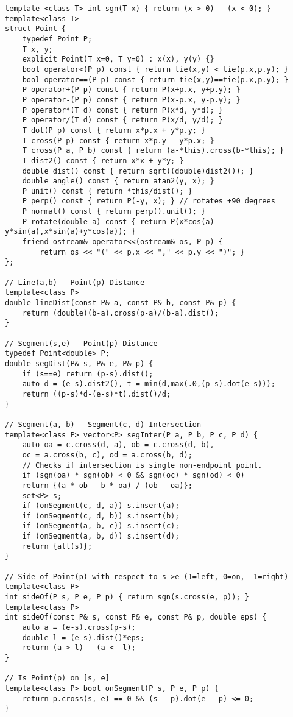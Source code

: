 \documentclass[a4paper,9pt]{article}
\begin{document}
\begin{lstlisting}
template <class T> int sgn(T x) { return (x > 0) - (x < 0); }
template<class T>
struct Point {
	typedef Point P;
	T x, y;
	explicit Point(T x=0, T y=0) : x(x), y(y) {}
	bool operator<(P p) const { return tie(x,y) < tie(p.x,p.y); }
	bool operator==(P p) const { return tie(x,y)==tie(p.x,p.y); }
	P operator+(P p) const { return P(x+p.x, y+p.y); }
	P operator-(P p) const { return P(x-p.x, y-p.y); }
	P operator*(T d) const { return P(x*d, y*d); }
	P operator/(T d) const { return P(x/d, y/d); }
	T dot(P p) const { return x*p.x + y*p.y; }
	T cross(P p) const { return x*p.y - y*p.x; }
	T cross(P a, P b) const { return (a-*this).cross(b-*this); }
	T dist2() const { return x*x + y*y; }
	double dist() const { return sqrt((double)dist2()); }
	double angle() const { return atan2(y, x); }
	P unit() const { return *this/dist(); }
	P perp() const { return P(-y, x); } // rotates +90 degrees
	P normal() const { return perp().unit(); }
	P rotate(double a) const { return P(x*cos(a)-y*sin(a),x*sin(a)+y*cos(a)); }
	friend ostream& operator<<(ostream& os, P p) {
		return os << "(" << p.x << "," << p.y << ")"; }
};

// Line(a,b) - Point(p) Distance
template<class P>
double lineDist(const P& a, const P& b, const P& p) {
	return (double)(b-a).cross(p-a)/(b-a).dist();
}

// Segment(s,e) - Point(p) Distance
typedef Point<double> P;
double segDist(P& s, P& e, P& p) {
	if (s==e) return (p-s).dist();
	auto d = (e-s).dist2(), t = min(d,max(.0,(p-s).dot(e-s)));
	return ((p-s)*d-(e-s)*t).dist()/d;
}

// Segment(a, b) - Segment(c, d) Intersection
template<class P> vector<P> segInter(P a, P b, P c, P d) {
	auto oa = c.cross(d, a), ob = c.cross(d, b),
	oc = a.cross(b, c), od = a.cross(b, d);
	// Checks if intersection is single non-endpoint point.
	if (sgn(oa) * sgn(ob) < 0 && sgn(oc) * sgn(od) < 0)
	return {(a * ob - b * oa) / (ob - oa)};
	set<P> s;
	if (onSegment(c, d, a)) s.insert(a);
	if (onSegment(c, d, b)) s.insert(b);
	if (onSegment(a, b, c)) s.insert(c);
	if (onSegment(a, b, d)) s.insert(d);
	return {all(s)};
}

// Side of Point(p) with respect to s->e (1=left, 0=on, -1=right)
template<class P>
int sideOf(P s, P e, P p) { return sgn(s.cross(e, p)); }
template<class P>
int sideOf(const P& s, const P& e, const P& p, double eps) {
	auto a = (e-s).cross(p-s);
	double l = (e-s).dist()*eps;
	return (a > l) - (a < -l);
}

// Is Point(p) on [s, e]
template<class P> bool onSegment(P s, P e, P p) {
	return p.cross(s, e) == 0 && (s - p).dot(e - p) <= 0;
}


\end{lstlisting}
\end{document}
